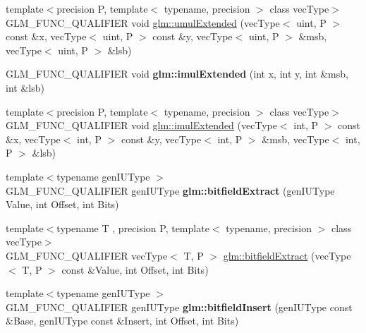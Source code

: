 \begin{DoxyCompactItemize}
\item 
{\footnotesize template$<$precision P, template$<$ typename, precision $>$ class vec\-Type$>$ }\\G\-L\-M\-\_\-\-F\-U\-N\-C\-\_\-\-Q\-U\-A\-L\-I\-F\-I\-E\-R void \hyperlink{group__core__func__integer_ga456ff9dcec42f6769a9ae2a2af7f1ce1}{glm\-::umul\-Extended} (vec\-Type$<$ uint, P $>$ const \&x, vec\-Type$<$ uint, P $>$ const \&y, vec\-Type$<$ uint, P $>$ \&msb, vec\-Type$<$ uint, P $>$ \&lsb)
\item 
\hypertarget{namespaceglm_a940501aa5c66bc19f9ba6ddfe0110097}{G\-L\-M\-\_\-\-F\-U\-N\-C\-\_\-\-Q\-U\-A\-L\-I\-F\-I\-E\-R void {\bfseries glm\-::imul\-Extended} (int x, int y, int \&msb, int \&lsb)}\label{namespaceglm_a940501aa5c66bc19f9ba6ddfe0110097}

\item 
{\footnotesize template$<$precision P, template$<$ typename, precision $>$ class vec\-Type$>$ }\\G\-L\-M\-\_\-\-F\-U\-N\-C\-\_\-\-Q\-U\-A\-L\-I\-F\-I\-E\-R void \hyperlink{group__core__func__integer_ga6e6e8b29ca40d8ca2df10b58ed17d426}{glm\-::imul\-Extended} (vec\-Type$<$ int, P $>$ const \&x, vec\-Type$<$ int, P $>$ const \&y, vec\-Type$<$ int, P $>$ \&msb, vec\-Type$<$ int, P $>$ \&lsb)
\item 
\hypertarget{namespaceglm_ab781f965cc1130fc70a0a8aaf50e6813}{{\footnotesize template$<$typename gen\-I\-U\-Type $>$ }\\G\-L\-M\-\_\-\-F\-U\-N\-C\-\_\-\-Q\-U\-A\-L\-I\-F\-I\-E\-R gen\-I\-U\-Type {\bfseries glm\-::bitfield\-Extract} (gen\-I\-U\-Type Value, int Offset, int Bits)}\label{namespaceglm_ab781f965cc1130fc70a0a8aaf50e6813}

\item 
{\footnotesize template$<$typename T , precision P, template$<$ typename, precision $>$ class vec\-Type$>$ }\\G\-L\-M\-\_\-\-F\-U\-N\-C\-\_\-\-Q\-U\-A\-L\-I\-F\-I\-E\-R vec\-Type$<$ T, P $>$ \hyperlink{group__core__func__integer_gab84b88f3a8e367774e5dd1c618c353cf}{glm\-::bitfield\-Extract} (vec\-Type$<$ T, P $>$ const \&Value, int Offset, int Bits)
\item 
\hypertarget{namespaceglm_acec32bd3c6eb5719c5aea5b423085ae6}{{\footnotesize template$<$typename gen\-I\-U\-Type $>$ }\\G\-L\-M\-\_\-\-F\-U\-N\-C\-\_\-\-Q\-U\-A\-L\-I\-F\-I\-E\-R gen\-I\-U\-Type {\bfseries glm\-::bitfield\-Insert} (gen\-I\-U\-Type const \&Base, gen\-I\-U\-Type const \&Insert, int Offset, int Bits)}\label{namespaceglm_acec32bd3c6eb5719c5aea5b423085ae6}


\end{DoxyCompactItemize}
